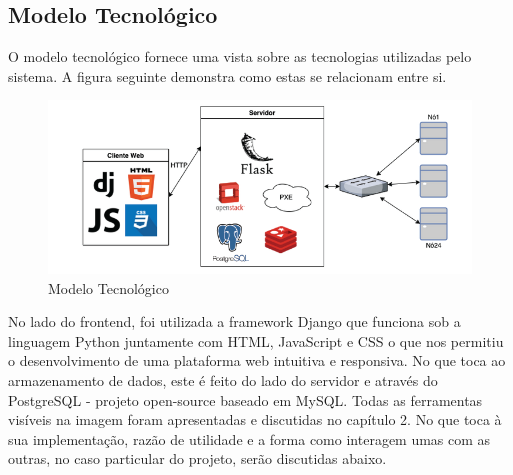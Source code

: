 \subsection{Modelo Tecnológico}
O modelo tecnológico fornece uma vista sobre as tecnologias utilizadas pelo sistema. A figura seguinte demonstra como estas se relacionam entre si.

\begin{figure}[!ht]
    \centering
    \includegraphics[height=0.3\textheight]{images/tecno.png}
    \caption{Modelo Tecnológico}
    \label{fig:tecno}
\end{figure}
\hfill\break
No lado do frontend, foi utilizada a framework Django que funciona sob a linguagem Python juntamente com HTML, JavaScript e CSS o que nos permitiu o desenvolvimento de uma plataforma web intuitiva e responsiva.\newline
No que toca ao armazenamento de dados, este é feito do lado do servidor e através do PostgreSQL - projeto open-source baseado em MySQL. \newline
Todas as ferramentas visíveis na imagem foram apresentadas e discutidas no capítulo 2. No que toca à sua implementação, razão de utilidade e a forma como interagem umas com as outras, no caso particular do projeto, serão discutidas abaixo.
\newpage
\hfill\break